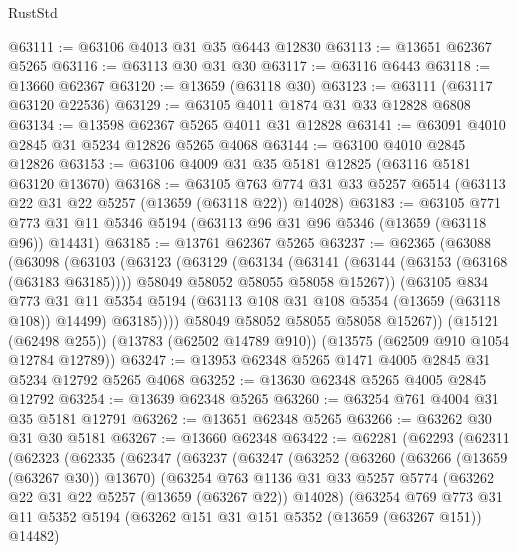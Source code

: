 \begin{lexlean}{RustStd}
\begin{coremodule}
@63111 := @63106 @4013 @31 @35 @6443 @12830
@63113 := @13651 @62367 @5265
@63116 := @63113 @30 @31 @30
@63117 := @63116 @6443
@63118 := @13660 @62367
@63120 := @13659 (@63118 @30)
@63123 := @63111 (@63117 @63120 @22536)
@63129 := @63105 @4011 @1874 @31 @33 @12828 @6808
@63134 := @13598 @62367 @5265 @4011 @31 @12828
@63141 := @63091 @4010 @2845 @31 @5234 @12826 @5265 @4068
@63144 := @63100 @4010 @2845 @12826
@63153 := @63106 @4009 @31 @35 @5181 @12825 (@63116 @5181 @63120 @13670)
@63168 := @63105
    @763
    @774
    @31
    @33
    @5257
    @6514
    (@63113 @22 @31 @22 @5257 (@13659 (@63118 @22)) @14028)
@63183 := @63105
    @771
    @773
    @31
    @11
    @5346
    @5194
    (@63113 @96 @31 @96 @5346 (@13659 (@63118 @96)) @14431)
@63185 := @13761 @62367 @5265
@63237 := @62365
    (@63088
      (@63098
        (@63103
          (@63123
            (@63129
              (@63134
                (@63141
                  (@63144 (@63153 (@63168 (@63183 @63185))))
                  @58049
                  @58052
                  @58055
                  @58058
                  @15267))
              (@63105
                @834
                @773
                @31
                @11
                @5354
                @5194
                (@63113 @108 @31 @108 @5354 (@13659 (@63118 @108)) @14499)
                @63185))))
        @58049
        @58052
        @58055
        @58058
        @15267))
    (@15121 (@62498 @255))
    (@13783 (@62502 @14789 @910))
    (@13575 (@62509 @910 @1054 @12784 @12789))
@63247 := @13953 @62348 @5265 @1471 @4005 @2845 @31 @5234 @12792 @5265 @4068
@63252 := @13630 @62348 @5265 @4005 @2845 @12792
@63254 := @13639 @62348 @5265
@63260 := @63254 @761 @4004 @31 @35 @5181 @12791
@63262 := @13651 @62348 @5265
@63266 := @63262 @30 @31 @30 @5181
@63267 := @13660 @62348
@63422 := @62281
    (@62293
      (@62311
        (@62323
          (@62335
            (@62347
              (@63237
                (@63247
                  (@63252
                    (@63260
                      (@63266 (@13659 (@63267 @30)) @13670)
                      (@63254
                        @763
                        @1136
                        @31
                        @33
                        @5257
                        @5774
                        (@63262 @22 @31 @22 @5257 (@13659 (@63267 @22)) @14028)
                        (@63254
                          @769
                          @773
                          @31
                          @11
                          @5352
                          @5194
                          (@63262 @151 @31 @151 @5352 (@13659 (@63267 @151)) @14482)

\end{coremodule}
\end{lexlean}
